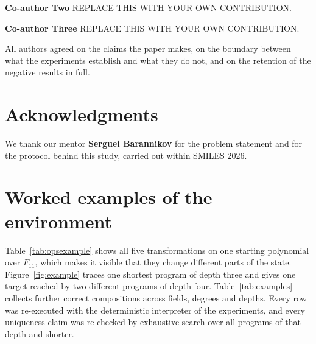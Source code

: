 \documentclass{zapiski}
\begin{document}
\textbf{Co-author Two} REPLACE THIS WITH YOUR OWN CONTRIBUTION.

\textbf{Co-author Three} REPLACE THIS WITH YOUR OWN CONTRIBUTION.

All authors agreed on the claims the paper makes, on the boundary between what the
experiments establish and what they do not, and on the retention of the negative
results in full.

\section*{Acknowledgments}

We thank our mentor \textbf{Serguei Barannikov} for the problem statement and for the
protocol behind this study, carried out within SMILES 2026.

\clearpage
\appendix
\renewcommand{\thesection}{\Alph{section}}
\setcounter{section}{0}

\section{Worked examples of the environment}
\label{app:examples}

Table~\ref{tab:opsexample} shows all five transformations on one starting polynomial
over $F_{11}$, which makes it visible that they change different parts of the state.
Figure~\ref{fig:example} traces one shortest program of depth three and gives one
target reached by two different programs of depth four.
Table~\ref{tab:examples} collects further correct compositions across fields, degrees
and depths. Every row was re-executed with the deterministic interpreter of the
experiments, and every uniqueness claim was re-checked by exhaustive search over all
programs of that depth and shorter.



\end{document}
